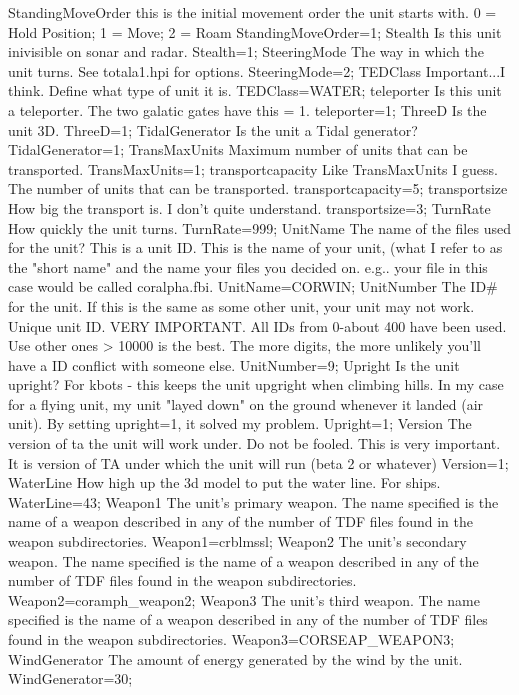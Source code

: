 \documentclass[a4paper,10pt]{article}
\begin{document}
StandingMoveOrder 	this is the initial movement order the unit starts with.  0 = Hold Position; 1 = Move; 2 = Roam 	StandingMoveOrder=1;
Stealth 	Is this unit inivisible on sonar and radar. 	Stealth=1;
SteeringMode 	The way in which the unit turns. See totala1.hpi for options. 	SteeringMode=2;
TEDClass 	Important...I think. Define what type of unit it is. 	TEDClass=WATER;
teleporter 	Is this unit a teleporter. The two galatic gates have this = 1. 	teleporter=1;
ThreeD 	Is the unit 3D. 	ThreeD=1;
TidalGenerator 	Is the unit a Tidal generator? 	TidalGenerator=1;
TransMaxUnits 	Maximum number of units that can be transported. 	TransMaxUnits=1;
transportcapacity 	Like TransMaxUnits I guess. The number of units that can be transported. 	transportcapacity=5;
transportsize 	How big the transport is. I don't quite understand. 	transportsize=3;
TurnRate 	How quickly the unit turns. 	TurnRate=999;
UnitName 	The name of the files used for the unit? This is a unit ID.  This is the name of your unit, (what I refer to as the "short name" and the name your files you decided on. e.g.. your file in this case would be called coralpha.fbi.   	UnitName=CORWIN;
UnitNumber 	The ID\# for the unit. If this is the same as some other unit, your unit may not work.  Unique unit ID. VERY IMPORTANT. All IDs from 0-about 400 have been used. Use other ones > 10000 is the best. The more digits, the more unlikely you'll have a ID conflict with someone else.    	UnitNumber=9;
Upright 	Is the unit upright?  For kbots - this keeps the unit upgright when climbing hills.  In my case for a flying unit, my unit "layed down" on the ground whenever it landed (air unit).  By setting upright=1, it solved my problem. 	Upright=1;
Version 	The version of ta the unit will work under.   Do not be fooled. This is very important. It is version of TA under which the unit will run (beta 2 or whatever)   	Version=1;
WaterLine 	How high up the 3d model to put the water line. For ships. 	WaterLine=43;
Weapon1 	The unit's primary weapon.  The name specified is the name of a weapon described in any of the number of TDF files found in the weapon subdirectories. 	Weapon1=crblmssl;
Weapon2 	The unit's secondary weapon.  The name specified is the name of a weapon described in any of the number of TDF files found in the weapon subdirectories. 	Weapon2=coramph\_weapon2;
Weapon3 	The unit's third weapon.  The name specified is the name of a weapon described in any of the number of TDF files found in the weapon subdirectories. 	Weapon3=CORSEAP\_WEAPON3;
WindGenerator 	The amount of energy generated by the wind by the unit. 	WindGenerator=30;
\end{document}
